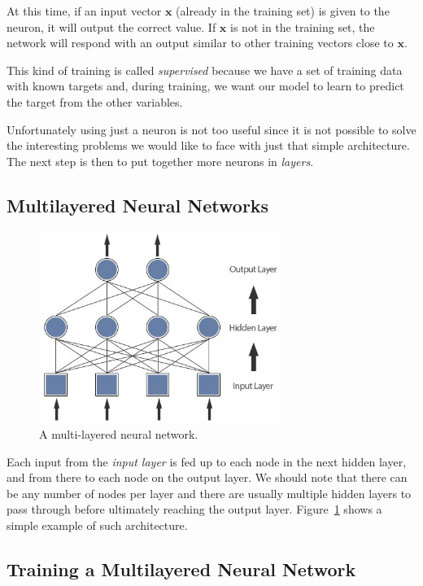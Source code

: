 At this time, if an input vector \(\mathbf{x}\) (already in the training
set) is given to the neuron, it will output the correct value. If
\(\mathbf{x}\) is not in the training set, the network will respond with
an output similar to other training vectors close to \(\mathbf{x}\).

This kind of training is called \emph{supervised} because we have a set of training data with known targets and, during training, we want our model to learn to predict the target from the other variables.

Unfortunately using just a neuron is not too useful since it is not
possible to solve the interesting problems we would like to face with
just that simple architecture. The next step is then to put together
more neurons in \emph{layers}.

\subsection{Multilayered Neural Networks}\label{multi-layered-neural-networks}

\begin{figure}[htb]
	\centering
	\includegraphics[width=0.7\textwidth]{figures/multilayer.jpeg}
	\caption{A multi-layered neural network.}
        \label{fig:multilayered_nn}
\end{figure}

Each input from the \emph{input layer} is fed up to each node in the
next hidden layer, and from there to each node on the output layer. We
should note that there can be any number of nodes per layer and there
are usually multiple hidden layers to pass through before ultimately
reaching the output layer. Figure~\ref{fig:multilayered_nn} shows a simple
example of such architecture.

\subsection{Training a Multilayered Neural Network}\label{training-a-multilayered-neural-network}


